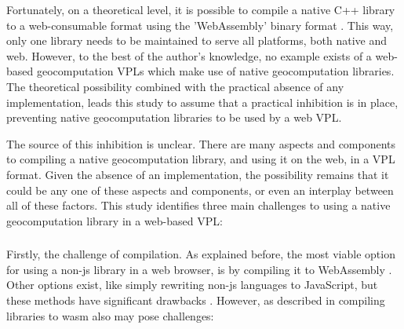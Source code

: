 Fortunately, on a theoretical level, it is possible to compile a native C++ library to a web-consumable format using the 'WebAssembly' binary format \citep{haas_bringing_2017}.
This way, only one library needs to be maintained to serve all platforms, both native and web. 
However, to the best of the author's knowledge, no example exists of a web-based geocomputation VPLs which make use of native geocomputation libraries.
The theoretical possibility combined with the practical absence of any implementation, leads this study to assume that a practical inhibition is in place, preventing native geocomputation libraries to be used by a web VPL.

The source of this inhibition is unclear. 
There are many aspects and components to compiling a native geocomputation library, and using it on the web, in a VPL format. 
Given the absence of an implementation, the possibility remains that it could be any one of these aspects and components, or even an interplay between all of these factors. 
This study identifies three main challenges to using a native geocomputation library in a web-based VPL:

\subsubsection*{\mySubRQTwoTitle}


Firstly, the challenge of compilation. 
As explained before, the most viable option for using a non-js library in a web browser, is by compiling it to WebAssembly \citep{haas_bringing_2017}.
Other options exist, like simply rewriting non-js languages to JavaScript, but these methods have significant drawbacks \citep{haas_bringing_2017,jangda_not_2019}.
However, as described in  compiling libraries to \ac{wasm} also may pose challenges:


